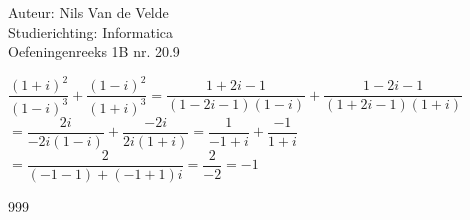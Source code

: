 \documentclass[a4paper]{article}
\begin{document}
  
\noindent \large Auteur: Nils Van de Velde \\
\noindent \large Studierichting: Informatica\\
\noindent \large Oefeningenreeks 1B nr. 20.9\\

\medskip

\normalsize

$\dfrac{(1+i)^2}{(1-i)^3} + \dfrac{(1-i)^2}{(1+i)^3} = 
\dfrac{1+2i-1}{(1-2i-1)(1-i)} + \dfrac{1-2i-1}{(1+2i-1)(1+i)}$\\

$= \dfrac{2i}{-2i(1-i)} + \dfrac{-2i}{2i(1+i)} = \dfrac{1}{-1+i} + \dfrac{-1}{1+i}$\\

$= \dfrac{2}{(-1-1) + (-1+1)i} = \dfrac{2}{-2} = -1$\\

\begin{thebibliography}{999}
\end{thebibliography}
\end{document}
